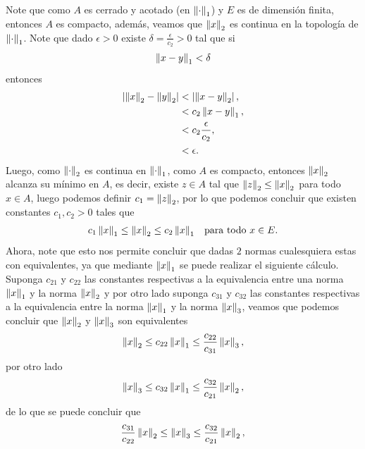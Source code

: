 \begin{homeworkProblem}
\begin{solution}
\begin{enumerate}[(i)]
        Note que como $A$ es cerrado y acotado (en $\left\|\cdot\right\|_{1}$) y $E$ es de dimensión finita, entonces $A$ es compacto, además, veamos que $\left\|x\right\|_{2}$ es continua en la topología de $\left\|\cdot\right\|_{1}$.
        Note que dado $\epsilon>0$ existe $\delta=\frac{\epsilon}{c_2}>0$ tal que si
        \begin{align*}
          \left\|x-y\right\|_{1}<\delta
        \end{align*}
        entonces
        \begin{align*}
          \left| \left\|x\right\|_{2}-\left\|y\right\|_{2} \right|&<\left| \left\|x-y\right\|_{2} \right|,\\
          &<c_2\left\|x-y\right\|_{1},\\
          &<c_2\frac{\epsilon}{c_2},\\
          &<\epsilon.
        \end{align*}
        Luego, como $\left\|\cdot\right\|_{2}$ es continua en $\left\|\cdot\right\|_{1}$, como $A$ es compacto, entonces $\left\|x\right\|_{2}$ alcanza su mínimo en $A$, es decir, existe $z\in A$ tal que $\left\|z\right\|_{2}\leq \left\|x\right\|_{2}$ para todo $x\in A$, luego podemos definir $c_1=\left\|z\right\|_{2}$, por lo que podemos concluir que existen constantes $c_1,c_2>0$ tales que
        \begin{align*}
          c_1\left\|x\right\|_1\leq \left\|x\right\|_{2}\leq c_2\left\|x\right\|_{1} &&\text{para todo $x\in E$.}
        \end{align*}
        Ahora, note que esto nos permite concluir que dadas $2$ normas cualesquiera estas con equivalentes, ya que mediante $\left\|x\right\|_1$ se puede realizar el siguiente cálculo.\\
        Suponga $c_{21}$ y $c_{22}$ las constantes respectivas a la equivalencia entre una norma $\left\|x\right\|_{1}$ y la norma $\left\|x\right\|_{2}$ y por otro lado suponga $c_{31}$ y $c_{32}$ las constantes respectivas a la equivalencia entre la norma $\left\|x\right\|_{1}$ y la norma $\left\|x\right\|_{3}$, veamos que podemos concluir que $\left\|x\right\|_{2}$ y $\left\|x\right\|_{3}$ son equivalentes 
        \begin{align*}
          \left\|x\right\|_{2}\leq c_{22}\left\|x\right\|_1\leq \frac{c_{22}}{c_{31}}\left\|x\right\|_{3},
        \end{align*}
        por otro lado
        \begin{align*}
          \left\|x\right\|_{3}\leq c_{32}\left\|x\right\|_{1}\leq \frac{c_{32}}{c_{21}}\left\|x\right\|_{2},
        \end{align*}
        de lo que se puede concluir que
        \begin{align*}
          \frac{c_{31}}{c_{22}}\norm{x}_{2}\leq\norm{x}_{3}\leq \frac{c_{32}}{c_{21}}\norm{x}_{2},

\end{align*}
\end{enumerate}
\end{solution}
\end{homeworkProblem}
